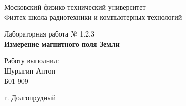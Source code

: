 
\begin{titlepage}
	\begin{center}
		\large 	Московский физико-технический университет \\
		Физтех-школа радиотехники и компьютерных технологий\\
		\vspace{0.2cm}
		
		\vspace{4.5cm}
		Лабораторная работа № 1.2.3 \\ \vspace{0.2cm}
		\LARGE \textbf{Измерение магнитного поля Земли}
	\end{center}
	\vspace{2.3cm} \large
	
	\begin{center}
		Работу выполнил: \\
		Шурыгин Антон \\
		Б01-909

	\end{center}
	
	\begin{center} \vspace{60mm}
		г. Долгопрудный \\
	\end{center}
\end{titlepage}